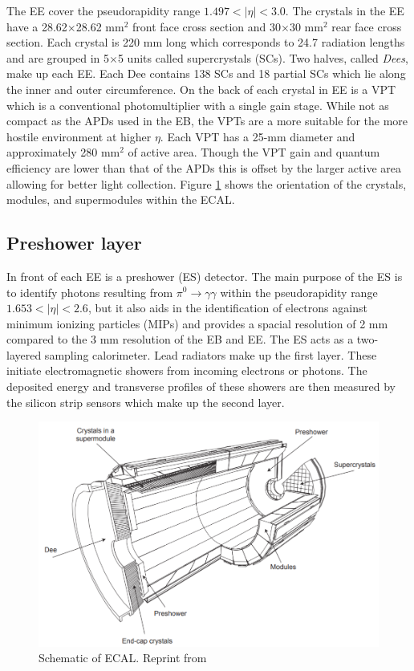 The EE cover the pseudorapidity range $1.497<|\eta|<3.0$.  The crystals in the EE have a 28.62$\times$28.62 mm$^{2}$ front face cross section and 30$\times$30 mm$^{2}$ rear face cross section.  Each crystal is 220 mm long which corresponds to 24.7 radiation lengths and are grouped in 5$\times$5 units called supercrystals (SCs).  Two halves, called \textit{Dees}, make up each EE.  Each Dee contains 138 SCs and 18 partial SCs which lie along the inner and outer circumference.  On the back of each crystal in EE is a VPT which is a conventional photomultiplier with a single gain stage. While not as compact as the APDs used in the EB, the VPTs are a more suitable for the more hostile environment at higher $\eta$.  Each VPT has a 25-mm diameter and approximately 280 mm$^{2}$ of active area.  Though the VPT gain and quantum efficiency are lower than that of the APDs this is offset by the larger active area allowing for better light collection.  Figure \ref{fig:ecallayout} shows the orientation of the crystals, modules, and supermodules within the ECAL.   \cite{Collaboration_2008}


\subsection{Preshower layer}
In front of each EE is a preshower (ES) detector.  The main purpose of the ES is to identify photons resulting from $\pi^{0}\rightarrow \gamma \gamma$ within the pseudorapidity range $1.653 < |\eta| < 2.6$, but it also aids in the identification of electrons against minimum ionizing particles (MIPs) and provides a spacial resolution of 2 mm compared to the 3 mm resolution of the EB and EE.  The ES acts as a two-layered sampling calorimeter.  Lead radiators make up the first layer.   These initiate electromagnetic showers from incoming electrons or photons.  The deposited energy and transverse profiles of these showers are then measured by the silicon strip sensors which make up the second layer.  

\begin{figure}[h]
	\centering
	\includegraphics[width=1.0\linewidth]{Figures/ECAL_layout}
	\caption{Schematic of ECAL. Reprint from \cite{Collaboration_2008}}
	\label{fig:ecallayout}
\end{figure}

